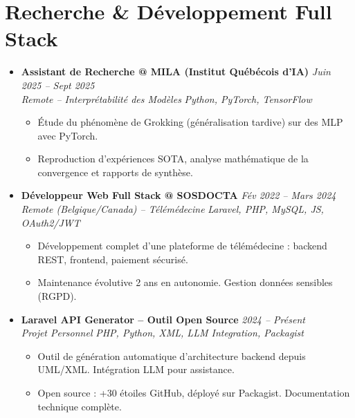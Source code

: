 \documentclass[a4paper,11pt]{article}
\begin{document}
\section{Recherche \& Développement Full Stack}
\begin{itemize}[leftmargin=*, label={-}]

\item \textbf{Assistant de Recherche @ MILA (Institut Québécois d'IA)} \hfill \textit{Juin 2025 -- Sept 2025} \\
\textit{Remote -- Interprétabilité des Modèles} \hfill \textit{Python, PyTorch, TensorFlow}
\vspace{-2pt}
    \begin{itemize}[leftmargin=0.4cm, nosep, label=\tiny$\bullet$]
        \item \small{Étude du phénomène de Grokking (généralisation tardive) sur des MLP avec PyTorch.}
        \item \small{Reproduction d'expériences SOTA, analyse mathématique de la convergence et rapports de synthèse.}
    \end{itemize}
\vspace{3pt}

\item \textbf{Développeur Web Full Stack @ SOSDOCTA} \hfill \textit{Fév 2022 -- Mars 2024} \\
\textit{Remote (Belgique/Canada) -- Télémédecine} \hfill \textit{Laravel, PHP, MySQL, JS, OAuth2/JWT}
\vspace{-2pt}
    \begin{itemize}[leftmargin=0.4cm, nosep, label=\tiny$\bullet$]
        \item \small{Développement complet d'une plateforme de télémédecine : backend REST, frontend, paiement sécurisé.}
        \item \small{Maintenance évolutive 2 ans en autonomie. Gestion données sensibles (RGPD).}
    \end{itemize}
\vspace{3pt}

\item \textbf{Laravel API Generator -- Outil Open Source} \hfill \textit{2024 -- Présent} \\
\textit{Projet Personnel} \hfill \textit{PHP, Python, XML, LLM Integration, Packagist}
\vspace{-2pt}
    \begin{itemize}[leftmargin=0.4cm, nosep, label=\tiny$\bullet$]
        \item \small{Outil de génération automatique d'architecture backend depuis UML/XML. Intégration LLM pour assistance.}
        \item \small{Open source : +30 étoiles GitHub, déployé sur Packagist. Documentation technique complète.}
    \end{itemize}
\vspace{3pt}

\end{itemize}
\end{document}
